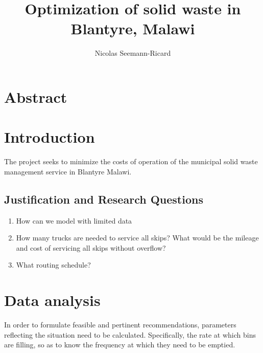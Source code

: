 \documentclass[
  letterpaper,
  DIV=11,
  numbers=noendperiod]{scrartcl}
\title{Optimization of solid waste in Blantyre, Malawi}
\author{Nicolas Seemann-Ricard}
\date{}
\providecommand{\tightlist}{%
  \setlength{\itemsep}{0pt}\setlength{\parskip}{0pt}}\usepackage{longtable,booktabs,array}
\begin{document}
\maketitle
\ifdefined\Shaded\renewenvironment{Shaded}{\begin{tcolorbox}[breakable, frame hidden, interior hidden, sharp corners, boxrule=0pt, enhanced, borderline west={3pt}{0pt}{shadecolor}]}{\end{tcolorbox}}\fi

\hypertarget{abstract}{%
\section{Abstract}\label{abstract}}

\hypertarget{introduction}{%
\section{Introduction}\label{introduction}}

The project seeks to minimize the costs of operation of the municipal
solid waste management service in Blantyre Malawi.

\hypertarget{justification-and-research-questions}{%
\subsection{Justification and Research
Questions}\label{justification-and-research-questions}}

\begin{enumerate}
\def\labelenumi{\arabic{enumi}.}
\tightlist
\item
  How can we model with limited data
\item
  How many trucks are needed to service all skips? What would be the
  mileage and cost of servicing all skips without overflow?
\item
  What routing schedule?
\end{enumerate}

\hypertarget{data-analysis}{%
\section{Data analysis}\label{data-analysis}}

In order to formulate feasible and pertinent recommendations, parameters
reflecting the situation need to be calculated. Specifically, the rate
at which bins are filling, so as to know the frequency at which they
need to be emptied.
\end{document}
